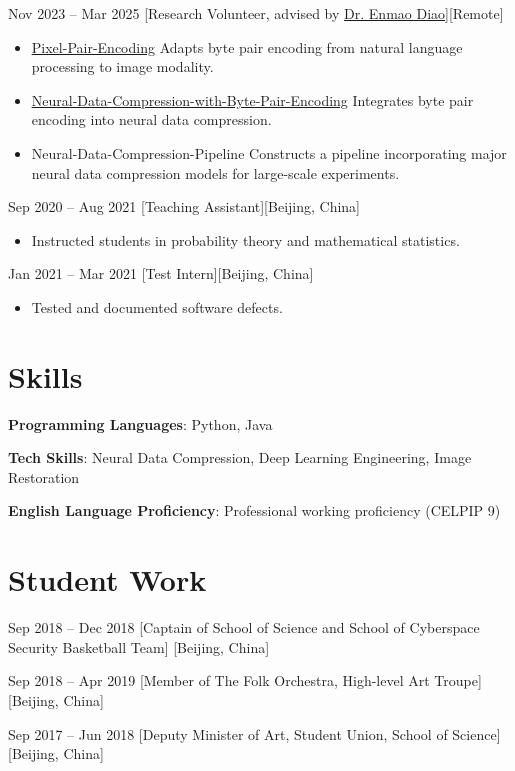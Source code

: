 \documentclass{chicv}
\begin{document}
  {Nov 2023 -- Mar 2025}
  [Research Volunteer, advised by \href{https://diaoenmao.com/}{\underline{Dr. Enmao Diao}}][Remote]
  \begin{itemize}
    \item \href{https://github.com/yubohuangai/Pixel-Pair-Encoding}{\underline{Pixel-Pair-Encoding}} Adapts byte pair encoding from natural language processing to image modality.
    \item \href{https://github.com/yubohuangai/Neural-Data-Compression-with-Byte-Pair-Encoding}{\underline{Neural-Data-Compression-with-Byte-Pair-Encoding}} Integrates byte pair encoding into neural data compression.
    \item Neural-Data-Compression-Pipeline Constructs a pipeline incorporating major neural data compression models for large-scale experiments.
  \end{itemize}

  {Sep 2020 -- Aug 2021}
  [Teaching Assistant][Beijing, China]
  \begin{itemize}
    \item Instructed students in probability theory and mathematical statistics.
  \end{itemize}

  {Jan 2021 -- Mar 2021}
  [Test Intern][Beijing, China]
  \begin{itemize}
    \item Tested and documented software defects.
  \end{itemize}

\section{Skills}
\begin{compactlist}
  \item \textbf{Programming Languages}: Python, Java
  \item \textbf{Tech Skills}: Neural Data Compression, Deep Learning Engineering, Image Restoration
  \item \textbf{English Language Proficiency}: Professional working proficiency (CELPIP 9)
\end{compactlist}

\section{Student Work}
  {Sep 2018 -- Dec 2018}
  [Captain of School of Science and School of Cyberspace Security Basketball Team]
  [Beijing, China]

  {Sep 2018 -- Apr 2019}
  [Member of The Folk Orchestra, High-level Art Troupe]
  [Beijing, China]

  {Sep 2017 -- Jun 2018}
  [Deputy Minister of Art, Student Union, School of Science]
  [Beijing, China]
\end{document}
